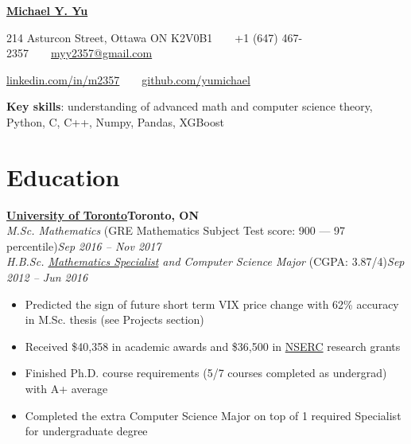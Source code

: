 \documentclass[10pt,letterpaper]{article}
\newcommand*\company[1]{\textbf{#1}}
\newcommand*\position[1]{\textit{#1}}
\newcommand*\location\company
\newcommand*\timespan\position
\begin{document}
\pagestyle{empty}
\begin{center}
{\huge\textbf{\href{https://github.com/yumichael/resume-v5}{Michael Y. Yu}}}

214 Asturcon Street, Ottawa ON K2V0B1\ \ \textbullet\ \ +1 (647) 467-2357\ \ \textbullet\ \ \href{mailto:myy2357@gmail.com}{myy2357@gmail.com}

\href{https://www.linkedin.com/in/m2357/}{linkedin.com/in/m2357}\ \ \textbullet\ \ \href{https://github.com/yumichael}{github.com/yumichael}
\end{center}
\textbf{Key skills}: understanding of advanced math and computer science theory, Python, C, C++, Numpy, Pandas, XGBoost

\section*{Education}
\company{\href{https://www.utoronto.ca/}{University of Toronto}}\hfill\location{Toronto, ON}\\
\position{M.Sc. Mathematics} (GRE Mathematics Subject Test score: 900 --- 97 percentile)\hfill\timespan{Sep 2016 -- Nov 2017}
\\
\position{H.B.Sc. \href{http://calendar.artsci.utoronto.ca/crs_mat.htm\#ASSPE1165}{Mathematics Specialist} and Computer Science Major} (CGPA: 3.87/4)\hfill\timespan{Sep 2012 -- Jun 2016}
\begin{itemize}
\item Predicted the sign of future short term VIX price change with 62\% accuracy in M.Sc. thesis (see Projects section)
\item Received \$40,358 in academic awards and \$36,500 in \href{http://www.nserc-crsng.gc.ca/index_eng.asp}{NSERC} research grants
\item Finished Ph.D. course requirements (5/7 courses completed as undergrad) with A+ average
\item Completed the extra Computer Science Major on top of 1 required Specialist for undergraduate degree
\end{itemize}
\end{document}
